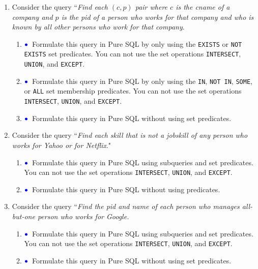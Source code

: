 \documentclass[11pt]{article}
\newcommand{\blue}[1]{{\color{blue}#1}}
\newcommand{\bluebullet}{$\blue{\bullet}$}
\begin{document}
\begin{enumerate}[resume]
\item \label{queryFour} 
Consider the query ``\emph{Find each $(c,p)$ pair where $c$ is the cname of a company and $p$ is the pid of a person who works
for that company and who is known by all other persons who work for that company}.
\begin{enumerate}
\item  \bluebullet\   Formulate this query in Pure SQL by only using the {\tt EXISTS} or {\tt NOT EXISTS} set predicates.
You can not use the set operations {\tt INTERSECT}, {\tt UNION}, and {\tt EXCEPT}.

\item  \bluebullet\ Formulate this query in Pure SQL by only using the {\tt  IN}, {\tt NOT IN}, {\tt SOME}, or {\tt ALL} set membership predicates.
You can not use the set operations {\tt INTERSECT}, {\tt UNION}, and {\tt EXCEPT}.

\item  \bluebullet\   Formulate this query in Pure SQL without using  set predicates.

\end{enumerate}

\item \label{queryFive} Consider the query ``\emph{Find each skill that is not a jobskill of any person who works for Yahoo or for Netflix}."
\begin{enumerate}

\item  \bluebullet\   Formulate this query in Pure SQL using  subqueries and set predicates.
You can not use the set operations {\tt INTERSECT}, {\tt UNION}, and {\tt EXCEPT}.

\item   \bluebullet\  Formulate this query in Pure SQL without using predicates.
\end{enumerate}

\item \label{querySeven} Consider the query ``\emph{Find the pid and name of each person who manages all-but-one person who works for Google.}
\begin{enumerate}
\item  \bluebullet\   Formulate this query in Pure SQL using subqueries and set predicates.
You can not use the set operations {\tt INTERSECT}, {\tt UNION}, and {\tt EXCEPT}.

\item   \bluebullet\  Formulate this query in Pure SQL without using set predicates.

\end{enumerate}
\end{enumerate}
\end{document}
